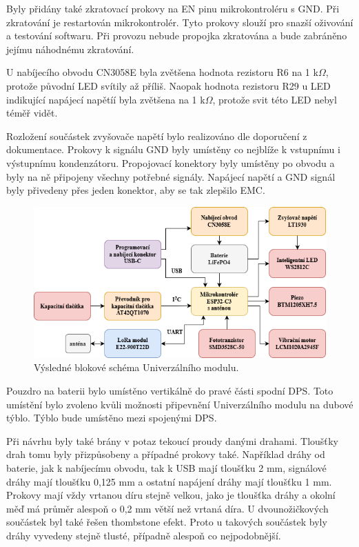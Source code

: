 Byly přidány také zkratovací prokovy na EN pinu mikrokontroléru s GND. Při zkratování je restartován mikrokontrolér. Tyto prokovy slouží pro snazší oživování a testování softwaru. Při provozu nebude propojka 
zkratována a bude zabráněno jejímu náhodnému zkratování. 

U nabíjecího obvodu CN3058E byla zvětšena hodnota rezistoru R6 na 1 k$\Omega$, protože původní LED svítily až příliš. Naopak hodnota rezistoru R29 u LED indikující napájecí napětíí byla zvětšena na 1 k$\Omega$, 
protože svit této LED nebyl téměř vidět. 

Rozložení součástek zvyšovače napětí bylo realizováno dle doporučení z dokumentace. Prokovy k signálu GND byly umístěny co nejblíže k vstupnímu i výstupnímu kondenzátoru. Propojovací konektory byly 
umístěny po obvodu a byly na ně připojeny všechny potřebné signály. Napájecí napětí a GND signál byly přivedeny přes jeden konektor, aby se tak zlepšilo EMC. 

\begin{figure}[!h]
  \begin{center}
    \includegraphics[scale=0.65]{obrazky/blokove_schema_finalni_verze.png}
  \end{center}
  \caption[Výsledné blokové schéma Univerzálního modulu]{Výsledné blokové schéma Univerzálního modulu.}
\end{figure}

Pouzdro na baterii bylo umístěno vertikálně do pravé části spodní DPS. Toto umístění bylo zvoleno kvůli možnosti připevnění Univerzálního modulu na dubové týblo. Týblo bude umístěno mezi spojenými DPS. 

Při návrhu byly také brány v potaz tekoucí proudy danými drahami. Tloušťky drah tomu byly přizpůsobeny a případné prokovy také. Například dráhy od baterie, jak k nabíjecímu obvodu, tak k USB mají tloušťku
2 mm, signálové dráhy mají tloušťku 0,125 mm a ostatní napájení dráhy mají tloušťku 1 mm. Prokovy mají vždy vrtanou díru stejně velkou, jako je tloušťka dráhy a okolní měď má průměr alespoň o 0,2 mm větší 
než vrtaná díra. U dvounožičkových součástek byl také řešen thombstone efekt. Proto u takových součástek byly dráhy vyvedeny stejně tlusté, případně alespoň co nejpodobnější. 
 
